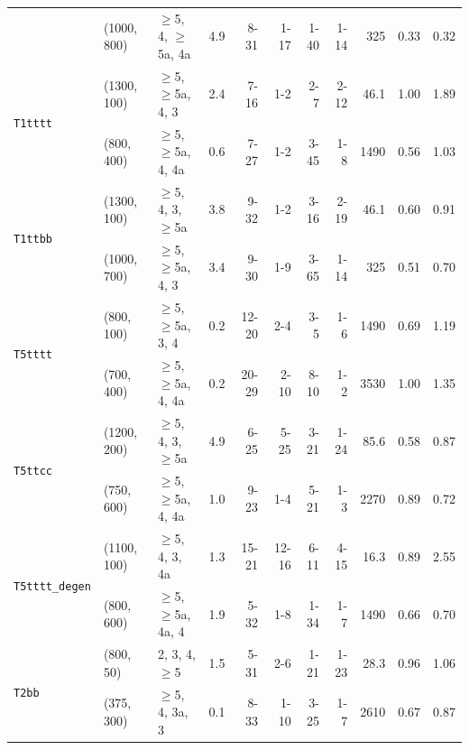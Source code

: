 \begin{table}[tb]
\begin{tabular}{ lllcrrrrrcc }
  & (1000, 800) & $\geq$5, 4, $\geq$5a, 4a & \phantom{1}4.9 & 8-31  & 1-17  & 1-40  & 1-14 & 325  & 0.33 & 0.32 \\ [0.5ex]
    \multirow{2}{*}{\texttt{T1tttt}}
  & (1300, 100) & $\geq$5, $\geq$5a, 4, 3  & \phantom{1}2.4 & 7-16  & 1-2   & 2-7   & 2-12 & 46.1 & 1.00 & 1.89 \\
  & (800, 400)  & $\geq$5, $\geq$5a, 4, 4a & \phantom{1}0.6 & 7-27  & 1-2   & 3-45  & 1-8  & 1490 & 0.56 & 1.03 \\ [0.5ex]
    \multirow{2}{*}{\texttt{T1ttbb}}
  & (1300, 100) & $\geq$5, 4, 3, $\geq$5a  & \phantom{1}3.8 & 9-32  & 1-2   & 3-16  & 2-19 & 46.1 & 0.60 & 0.91 \\
  & (1000, 700) & $\geq$5, $\geq$5a, 4, 3  & \phantom{1}3.4 & 9-30  & 1-9   & 3-65  & 1-14 & 325  & 0.51 & 0.70 \\ [0.5ex]
    \multirow{2}{*}{\texttt{T5tttt}}
  & (800, 100)  & $\geq$5, $\geq$5a, 3, 4  & \phantom{1}0.2 & 12-20 & 2-4   & 3-5   & 1-6  & 1490 & 0.69 & 1.19 \\
  & (700, 400)  & $\geq$5, $\geq$5a, 4, 4a & \phantom{1}0.2 & 20-29 & 2-10  & 8-10  & 1-2  & 3530 & 1.00 & 1.35 \\ [0.5ex]
    \multirow{2}{*}{\texttt{T5ttcc}}  
  & (1200, 200) & $\geq$5, 4, 3, $\geq$5a  & \phantom{1}4.9 & 6-25  & 5-25  & 3-21  & 1-24 & 85.6 & 0.58 & 0.87 \\
  & (750, 600)  & $\geq$5, $\geq$5a, 4, 4a & \phantom{1}1.0 & 9-23  & 1-4   & 5-21  & 1-3  & 2270 & 0.89 & 0.72 \\ [0.5ex]
    \multirow{2}{*}{\texttt{T5tttt\_degen}} 
  & (1100, 100) & $\geq$5, 4, 3, 4a        & \phantom{1}1.3 & 15-21 & 12-16 & 6-11  & 4-15 & 16.3 & 0.89 & 2.55 \\
  & (800, 600)  & $\geq$5, $\geq$5a, 4a, 4 & \phantom{1}1.9 & 5-32  & 1-8   & 1-34  & 1-7  & 1490 & 0.66 & 0.70 \\ [0.5ex]
    \multirow{2}{*}{\texttt{T2bb}}
  & (800, 50)   & 2, 3, 4, $\geq$5         & \phantom{1}1.5 & 5-31  & 2-6   & 1-21  & 1-23 & 28.3 & 0.96 & 1.06 \\
  & (375, 300)  & $\geq$5, 4, 3a, 3        & \phantom{1}0.1 & 8-33  & 1-10  & 3-25  & 1-7  & 2610 & 0.67 & 0.87 \\ [0.5ex]

\end{tabular}
\end{table}
